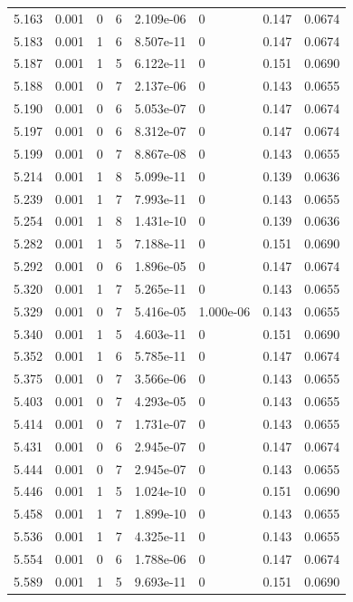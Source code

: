\documentclass[preview]{standalone}
\begin{document}
{{{{{\begin{tabular}{L{1.2cm}C{1.2cm} C{0.3cm}C{0.5cm} C{1.4cm}C{1.4cm} C{1.4cm}C{1.4cm}}
  5.163  &  0.001  & 0     &  6 &  2.109e-06  & 0  & 0.147 &  0.0674   \\ 
  5.183  &  0.001  & 1     &  6 &  8.507e-11  & 0  & 0.147 &  0.0674   \\ 
  5.187  &  0.001  & 1     &  5 &  6.122e-11  & 0  & 0.151 &  0.0690   \\ 
  5.188  &  0.001  & 0     &  7 &  2.137e-06  & 0  & 0.143 &  0.0655   \\ 
  5.190  &  0.001  & 0     &  6 &  5.053e-07  & 0  & 0.147 &  0.0674   \\ 
  5.197  &  0.001  & 0     &  6 &  8.312e-07  & 0  & 0.147 &  0.0674   \\ 
  5.199  &  0.001  & 0     &  7 &  8.867e-08  & 0  & 0.143 &  0.0655   \\ 
  5.214  &  0.001  & 1     &  8 &  5.099e-11  & 0  & 0.139 &  0.0636   \\ 
  5.239  &  0.001  & 1     &  7 &  7.993e-11  & 0  & 0.143 &  0.0655   \\ 
  5.254  &  0.001  & 1     &  8 &  1.431e-10  & 0  & 0.139 &  0.0636   \\ 
  5.282  &  0.001  & 1     &  5 &  7.188e-11  & 0  & 0.151 &  0.0690   \\ 
  5.292  &  0.001  & 0     &  6 &  1.896e-05  & 0  & 0.147 &  0.0674   \\ 
  5.320  &  0.001  & 1     &  7 &  5.265e-11  & 0  & 0.143 &  0.0655   \\ 
  5.329  &  0.001  & 0     &  7 &  5.416e-05  & 1.000e-06  & 0.143 &  0.0655   \\ 
  5.340  &  0.001  & 1     &  5 &  4.603e-11  & 0  & 0.151 &  0.0690   \\ 
  5.352  &  0.001  & 1     &  6 &  5.785e-11  & 0  & 0.147 &  0.0674   \\ 
  5.375  &  0.001  & 0     &  7 &  3.566e-06  & 0  & 0.143 &  0.0655   \\ 
  5.403  &  0.001  & 0     &  7 &  4.293e-05  & 0  & 0.143 &  0.0655   \\ 
  5.414  &  0.001  & 0     &  7 &  1.731e-07  & 0  & 0.143 &  0.0655   \\ 
  5.431  &  0.001  & 0     &  6 &  2.945e-07  & 0  & 0.147 &  0.0674   \\ 
  5.444  &  0.001  & 0     &  7 &  2.945e-07  & 0  & 0.143 &  0.0655   \\ 
  5.446  &  0.001  & 1     &  5 &  1.024e-10  & 0  & 0.151 &  0.0690   \\ 
  5.458  &  0.001  & 1     &  7 &  1.899e-10  & 0  & 0.143 &  0.0655   \\ 
  5.536  &  0.001  & 1     &  7 &  4.325e-11  & 0  & 0.143 &  0.0655   \\ 
  5.554  &  0.001  & 0     &  6 &  1.788e-06  & 0  & 0.147 &  0.0674   \\ 
  5.589  &  0.001  & 1     &  5 &  9.693e-11  & 0  & 0.151 &  0.0690   \\ 
\hline 
\end{tabular} 

}}}}}
\end{document}
